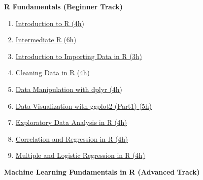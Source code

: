 \documentclass[
  11pt,
]{article}
\providecommand{\tightlist}{%
  \setlength{\itemsep}{0pt}\setlength{\parskip}{0pt}}
\newenvironment{tips}[1]
  {
  \begin{itemize}
  \footnotesize
  \renewcommand{\labelitemi}{
    \raisebox{-.7\height}[0pt][0pt]{
      {\setkeys{Gin}{width=3em,keepaspectratio}
        \texttt{[image: images/\#1.png]}}
    }
  }
  \setlength{\fboxsep}{1em}
  \begin{rbox}
  \item
  }
  {
  \end{rbox}
  \end{itemize}
  }
\begin{document}
\begin{tips}r

\textbf{R Fundamentals (Beginner Track)}

\begin{enumerate}
\def\labelenumi{\arabic{enumi}.}
\tightlist
\item
  \href{https://www.datacamp.com/courses/free-introduction-to-r}{Introduction to R (4h)}
\item
  \href{https://www.datacamp.com/courses/intermediate-r}{Intermediate R (6h)}
\item
  \href{https://www.datacamp.com/courses/importing-data-in-r-part-1}{Introduction to Importing Data in R (3h)}
\item
  \href{https://www.datacamp.com/courses/cleaning-data-in-r}{Cleaning Data in R (4h)}
\item
  \href{https://www.datacamp.com/courses/data-manipulation-with-dplyr-in-r}{Data Manipulation with dplyr (4h)}
\item
  \href{https://www.datacamp.com/courses/data-visualization-with-ggplot2-1}{Data Visualization with ggplot2 (Part1) (5h)}
\item
  \href{https://www.datacamp.com/courses/exploratory-data-analysis}{Exploratory Data Analysis in R (4h)}
\item
  \href{https://www.datacamp.com/courses/correlation-and-regression}{Correlation and Regression in R (4h)}
\item
  \href{https://www.datacamp.com/courses/multiple-and-logistic-regression}{Multiple and Logistic Regression in R (4h)}
\end{enumerate}

\textbf{Machine Learning Fundamentals in R (Advanced Track)}


\end{tips}
\end{document}
